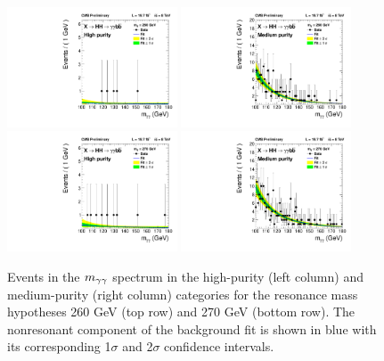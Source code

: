 \begin{figure}[htbp!]
 \begin{center}
   \includegraphics[width=0.45\textwidth]{figures/results/databkgoversig_cat0_260GeV.pdf}
   \includegraphics[width=0.45\textwidth]{figures/results/databkgoversig_cat1_260GeV.pdf}
   \includegraphics[width=0.45\textwidth]{figures/results/databkgoversig_cat0_270GeV.pdf}
   \includegraphics[width=0.45\textwidth]{figures/results/databkgoversig_cat1_270GeV.pdf}
 \end{center}
\caption{Events in the $m_{\gamma\gamma}$ spectrum in the high-purity (left column) and medium-purity
(right column) categories for the resonance mass hypotheses 260 GeV (top row) and 270 GeV (bottom row).
The nonresonant component of the background fit is shown in blue
with its corresponding 1$\sigma$ and 2$\sigma$ confidence intervals.}
\label{fig:datafit_260}
\end{figure}

